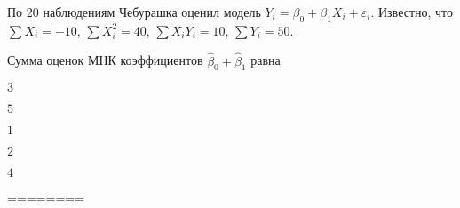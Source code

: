 
\begin{question}
По 20 наблюдениям Чебурашка оценил модель
\(Y_i = \beta_0 + \beta_1 X_i + \varepsilon_i\). Известно, что
\(\sum X_i = -10\), \(\sum X_i^2 = 40\), \(\sum X_i Y_i = 10\),
\(\sum Y_i = 50\).

Сумма оценок МНК коэффициентов \(\hat \beta_0 + \hat \beta_1\) равна
\begin{answerlist}
  \item \(3\)
  \item \(5\)
  \item \(1\)
  \item \(2\)
  \item \(4\)
\end{answerlist}
\end{question}

\begin{solution}
========
\end{solution}

